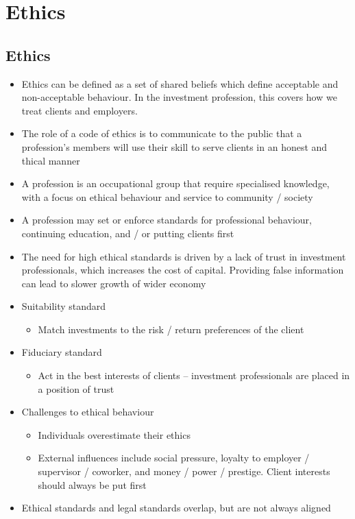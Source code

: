 \documentclass[../notes_compiled.tex]{subfiles}
\begin{document}
\section{Ethics}
\subsection{Ethics}
\begin{itemize}
\item Ethics can be defined as a set of shared beliefs which define acceptable and non-acceptable behaviour. In the investment profession, this covers how we treat clients and employers.
\item The role of a code of ethics is to communicate to the public that a profession’s members will use their skill to serve clients in an honest and thical manner
\item A profession is an occupational group that require specialised knowledge, with a focus on ethical behaviour and service to community / society
\item A profession may set or enforce standards for professional behaviour, continuing education, and / or putting clients first
\item The need for high ethical standards is driven by a lack of trust in investment professionals, which increases the cost of capital. Providing false information can lead to slower growth of wider economy
\item Suitability standard
\begin{itemize}
\item Match investments to the risk / return preferences of the client
\end{itemize}
\item Fiduciary standard
\begin{itemize}
\item Act in the best interests of clients -- investment professionals are placed in a position of trust
\end{itemize}
\item Challenges to ethical behaviour
\begin{itemize}
\item Individuals overestimate their ethics
\item External influences include social pressure, loyalty to employer / supervisor / coworker, and money / power / prestige. Client interests should always be put first
\end{itemize}
\item Ethical standards and legal standards overlap, but are not always aligned

\end{itemize}
\end{document}
